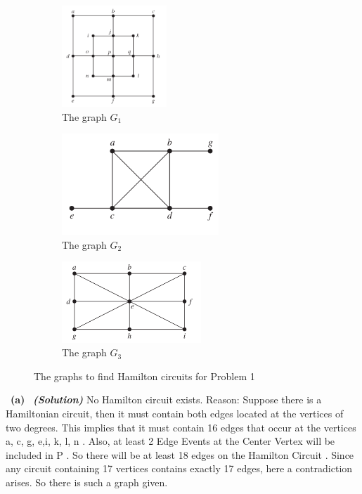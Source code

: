 \documentclass[a4 paper]{article}
\numberwithin{equation}{section}
\newcommand{\subproblem}[1]{~\newline\textbf{(#1)}}
\newcommand{\solution}{~\newline\textbf{\textit{(Solution)}} }
\newcommand{\0}{\mathbf{0}}
\begin{document}
\begin{figure}[h]
	\centering
	\begin{subfigure}[h]{0.5\textwidth}
		\centering
		\includegraphics[height=1.5in]{circuit-a.png}
		\caption{The graph $G_1$}
		\label{fig:G1a}
	\end{subfigure}%
	\begin{subfigure}[h]{0.5\textwidth}
		\centering
		\includegraphics[height=1.5in]{circuit-b.png}
		\caption{The graph $G_2$}
		\label{fig:G1b}
	\end{subfigure}
	\begin{subfigure}[h]{0.5\textwidth}
		\centering
		\includegraphics[height=1.2in]{circuit-c.png}
		\caption{The graph $G_3$}
		\label{fig:G1c}
	\end{subfigure}
	\caption{The graphs to find Hamilton circuits for Problem 1}
\end{figure}

\subproblem{a} \solution 
\newline No Hamilton circuit exists.
\newline Reason: Suppose there is a Hamiltonian circuit, then it must contain both edges located at the vertices of two degrees. This implies that it must contain 16 edges that occur at the vertices a, c, g, e,i, k, l, n . Also, at least 2 Edge Events at the Center Vertex will be included in P . So there will be at least 18 edges on the Hamilton Circuit . Since any circuit containing 17 vertices contains exactly 17 edges, here a contradiction arises. So there is such a graph given.
\end{document}
